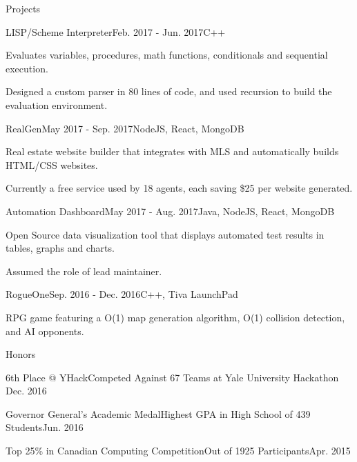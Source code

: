 \documentclass{resume} %
\begin{document}
\begin{rSection}{Projects}

\begin{projSec}{LISP/Scheme Interpreter}{Feb. 2017 - Jun. 2017}{C++ \href{https://github.com/jsun98/SchemePlusPlus}{\space\faGithub}}
\item Evaluates variables, procedures, math functions, conditionals and sequential execution.
\item Designed a custom parser in 80 lines of code, and used recursion to build the evaluation environment.
\end{projSec}

\begin{projSec}{RealGen}{May 2017 - Sep. 2017}{NodeJS, React, MongoDB \href{https://github.com/jsun98/RealGen}{\space\faGithub}}
\item Real estate website builder that integrates with MLS{\href{http://www.mls.com/}{\space\small\faExternalLink}} and automatically builds HTML/CSS websites.
\item Currently a free service used by 18 agents, each saving \$25 per website generated.
\end{projSec}

\begin{projSec}{Automation Dashboard}{May 2017 - Aug. 2017}{Java, NodeJS, React, MongoDB \href{https://github.com/AutoNinja/automation-dashboard}{\space\faGithub}}
\item Open Source data visualization tool that displays automated test results in tables, graphs and charts.
\item Assumed the role of lead maintainer.
\end{projSec}

\begin{projSec}{RogueOne}{Sep. 2016 - Dec. 2016}{C++, Tiva LaunchPad \href{https://github.com/jsun98/RogueOne}{\space\faGithub}}
\item RPG game featuring a O(1) map generation algorithm, O(1) collision detection, and AI opponents.
\end{projSec}

\end{rSection}


\begin{rSection}{Honors}

\begin{honorSec}{6th Place @ YHack}{Competed Against 67 Teams at Yale University Hackathon \href{https://devpost.com/software/yhack_unity_zombies}{\space\small\faExternalLink}}{Dec. 2016}\end{honorSec}
\begin{honorSec}{Governor General's Academic Medal}{Highest GPA in High School of 439 Students}{Jun. 2016}\end{honorSec}
\begin{honorSec}{Top 25\% in Canadian Computing Competition}{Out of 1925 Participants}{Apr. 2015}\end{honorSec}
\vspace{1em} 

\end{rSection}
\end{document}
